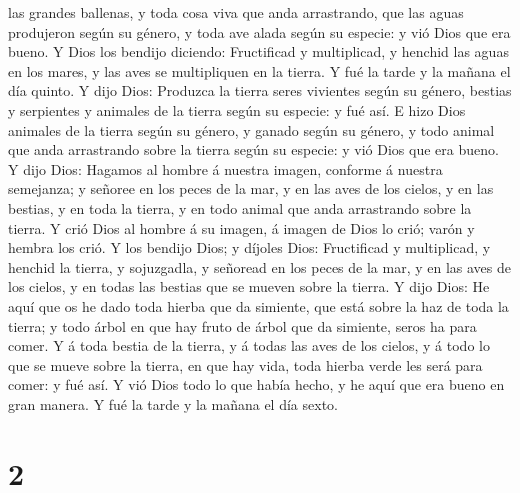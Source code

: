 las grandes ballenas, y toda cosa viva que anda arrastrando, que las
aguas produjeron según su género, y toda ave alada según su especie: y
vió Dios que era bueno.  Y Dios los bendijo diciendo:
Fructificad y multiplicad, y henchid las aguas en los mares, y las aves
se multipliquen en la tierra.  Y fué la tarde y la mañana
el día quinto.  Y dijo Dios: Produzca la tierra seres
vivientes según su género, bestias y serpientes y animales de la tierra
según su especie: y fué así.  E hizo Dios animales de la
tierra según su género, y ganado según su género, y todo animal que anda
arrastrando sobre la tierra según su especie: y vió Dios que era bueno.
 Y dijo Dios: Hagamos al hombre á nuestra imagen, conforme
á nuestra semejanza; y señoree en los peces de la mar, y en las aves de
los cielos, y en las bestias, y en toda la tierra, y en todo animal que
anda arrastrando sobre la tierra.  Y crió Dios al hombre á
su imagen, á imagen de Dios lo crió; varón y hembra los crió.
 Y los bendijo Dios; y díjoles Dios: Fructificad y
multiplicad, y henchid la tierra, y sojuzgadla, y señoread en los peces
de la mar, y en las aves de los cielos, y en todas las bestias que se
mueven sobre la tierra.  Y dijo Dios: He aquí que os he
dado toda hierba que da simiente, que está sobre la haz de toda la
tierra; y todo árbol en que hay fruto de árbol que da simiente, seros ha
para comer.  Y á toda bestia de la tierra, y á todas las
aves de los cielos, y á todo lo que se mueve sobre la tierra, en que hay
vida, toda hierba verde les será para comer: y fué así.  Y
vió Dios todo lo que había hecho, y he aquí que era bueno en gran
manera. Y fué la tarde y la mañana el día sexto.

\hypertarget{section-1}{%
\section{2}\label{section-1}}

